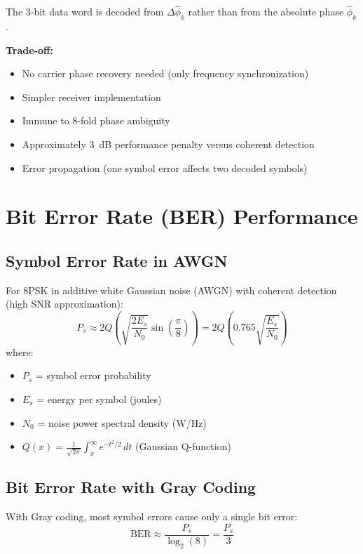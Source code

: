 The 3-bit data word is decoded from $\Delta\hat{\phi}_k$ rather than from the absolute phase $\hat{\phi}_k$.

\textbf{Trade-off:}
\begin{itemize}
\item[\checkmark] No carrier phase recovery needed (only frequency synchronization)
\item[\checkmark] Simpler receiver implementation
\item[\checkmark] Immune to 8-fold phase ambiguity
\item[\texttimes] Approximately 3~dB performance penalty versus coherent detection
\item[\texttimes] Error propagation (one symbol error affects two decoded symbols)
\end{itemize}

\section{Bit Error Rate (BER) Performance}

\subsection{Symbol Error Rate in AWGN}

For 8PSK in additive white Gaussian noise (AWGN) with coherent detection (high SNR approximation):
\begin{equation}
P_s \approx 2Q\left(\sqrt{\frac{2E_s}{N_0}} \sin\left(\frac{\pi}{8}\right)\right) = 2Q\left(0.765\sqrt{\frac{E_s}{N_0}}\right)
\end{equation}
where:
\begin{itemize}
\item $P_s$ = symbol error probability
\item $E_s$ = energy per symbol (joules)
\item $N_0$ = noise power spectral density (W/Hz)
\item $Q(x) = \frac{1}{\sqrt{2\pi}} \int_x^\infty e^{-t^2/2} \, dt$ (Gaussian Q-function)
\end{itemize}

\subsection{Bit Error Rate with Gray Coding}

With Gray coding, most symbol errors cause only a single bit error:
\begin{equation}
\mathrm{BER} \approx \frac{P_s}{\log_2(8)} = \frac{P_s}{3}
\end{equation}

